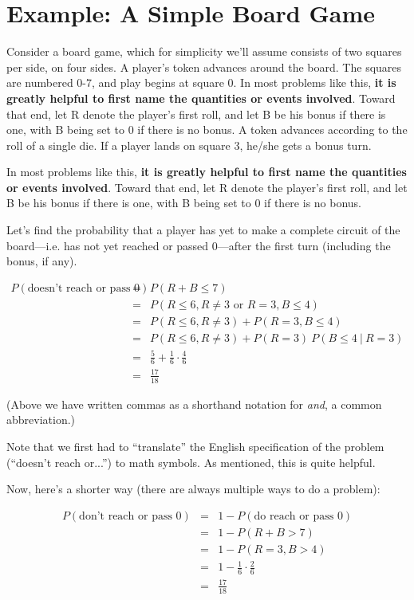 \section{Example:  A Simple Board Game} 
\label{boardgame}

Consider a board game, which for simplicity we'll assume consists of two
squares per side, on four sides.  A player's token advances around the
board.  The squares are numbered 0-7, and play begins at square 0.  In
most problems like this, {\bf it is greatly helpful to first name the
quantities or events involved}.  Toward that end, let R denote the
player's first roll, and let B be his bonus if there is one, with B
being set to 0 if there is no bonus.  A token advances according to the
roll of a single die.  If a player lands on square 3, he/she gets a
bonus turn.

In most problems like this, {\bf it is greatly helpful to first name the
quantities or events involved}.  Toward that end, let R denote the
player's first roll, and let B be his bonus if there is one, with B
being set to 0 if there is no bonus.  

Let's find the probability that a player has yet to make a complete
circuit of the board---i.e. has not yet reached or passed 0---after the
first turn (including the bonus, if any).

\begin{eqnarray}
P(\textrm{doesn't reach or pass 0}) &=& P(R+B \leq 7) \\ 
&=& P(R \leq 6, R \neq 3 \textrm{ or } R = 3, B \leq 4) \\
&=& P(R \leq 6, R \neq 3) + P(R = 3, B \leq 4) \\
&=& P(R \leq 6, R \neq 3) + P(R = 3) ~ P(B \leq 4 ~|~ R = 3) \\
&=& \frac{5}{6} + \frac{1}{6} \cdot \frac{4}{6} \\
&=& \frac{17}{18}
\end{eqnarray}

(Above we have written commas as a shorthand notation for {\it and}, a
common abbreviation.)

Note that we first had to ``translate'' the English specification of the
problem (``doesn't reach or...'') to math symbols.  As mentioned, this
is quite helpful.

Now, here's a shorter way (there are always multiple ways to do a
problem):

\begin{eqnarray}
P(\textrm{don't reach or pass 0}) &=& 1 - P(\textrm{do reach or pass 0}) \\ 
&=& 1 - P(R + B > 7) \\
&=& 1 - P(R = 3,  B > 4) \\
&=& 1 - \frac{1}{6} \cdot \frac{2}{6} \\
&=& \frac{17}{18}
\end{eqnarray}

